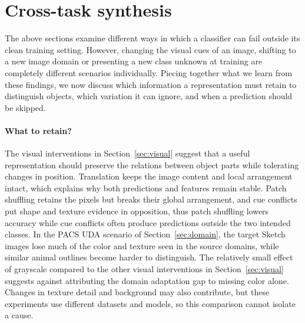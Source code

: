 \documentclass{article}
\begin{document}
\FloatBarrier
\section{Cross-task synthesis}
The above sections examine different ways in which a classifier can fail outside its clean training setting. However, changing the visual cues of an image, shifting to a new image domain or presenting a new class unknown at training are completely different scenarios individually. Piecing together what we learn from these findings, we now discuss which information a representation must retain to distinguish objects, which variation it can ignore, and when a prediction should be skipped.

\paragraph{What to retain?}\mbox{}\par
The visual interventions in Section~\ref{sec:visual} suggest that a useful representation should preserve the relations between object parts while tolerating changes in position. Translation keeps the image content and local arrangement intact, which explains why both predictions and features remain stable. Patch shuffling retains the pixels but breaks their global arrangement, and cue conflicts put shape and texture evidence in opposition, thus patch shuffling lowers accuracy while cue conflicts often produce predictions outside the two intended classes. In the PACS UDA scenario of Section~\ref{sec:domain}, the target Sketch images lose much of the color and texture seen in the source domains, while similar animal outlines become harder to distinguish. The relatively small effect of grayscale compared to the other visual interventions in Section~\ref{sec:visual} suggests against attributing the domain adaptation gap to missing color alone. Changes in texture detail and background may also contribute, but these experiments use different datasets and models, so this comparison cannot isolate a cause.
\end{document}
